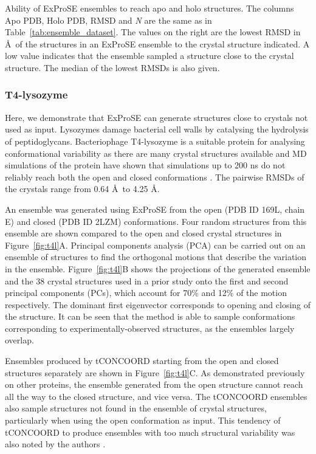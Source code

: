 \begin{table}
\centering


\caption{Ability of ExProSE ensembles to reach apo and holo structures.
The columns Apo PDB, Holo PDB, RMSD and \textit{N} are the same as in Table~\ref{tab:ensemble_dataset}.
The values on the right are the lowest RMSD in \AA\ of the structures in an ExProSE ensemble to the crystal structure indicated.
A low value indicates that the ensemble sampled a structure close to the crystal structure.
The median of the lowest RMSDs is also given.}

\label{tab:ensemble_dataset_ex}
\end{table}


\subsubsection{T4-lysozyme}

Here, we demonstrate that ExProSE can generate structures close to crystals not used as input.
Lysozymes damage bacterial cell walls by catalysing the hydrolysis of peptidoglycans.
Bacteriophage T4-lysozyme is a suitable protein for analysing conformational variability as there are many crystal structures available and MD simulations of the protein have shown that simulations up to 200 ns do not reliably reach both the open and closed conformations \cite{Seeliger2007}.
The pairwise RMSDs of the crystals range from 0.64 \AA\ to 4.25 \AA.

An ensemble was generated using ExProSE from the open (PDB ID 169L, chain E) and closed (PDB ID 2LZM) conformations.
Four random structures from this ensemble are shown compared to the open and closed crystal structures in Figure~\ref{fig:t4l}A.
Principal components analysis (PCA) can be carried out on an ensemble of structures to find the orthogonal motions that describe the variation in the ensemble.
Figure~\ref{fig:t4l}B shows the projections of the generated ensemble and the 38 crystal structures used in a prior study \cite{DeGroot1998} onto the first and second principal components (PCs), which account for 70\% and 12\% of the motion respectively.
The dominant first eigenvector corresponds to opening and closing of the structure.
It can be seen that the method is able to sample conformations corresponding to experimentally-observed structures, as the ensembles largely overlap.

Ensembles produced by tCONCOORD starting from the open and closed structures separately are shown in Figure~\ref{fig:t4l}C.
As demonstrated previously on other proteins, the ensemble generated from the open structure cannot reach all the way to the closed structure, and vice versa.
The tCONCOORD ensembles also sample structures not found in the ensemble of crystal structures, particularly when using the open conformation as input.
This tendency of tCONCOORD to produce ensembles with too much structural variability was also noted by the authors \cite{Seeliger2009}.

